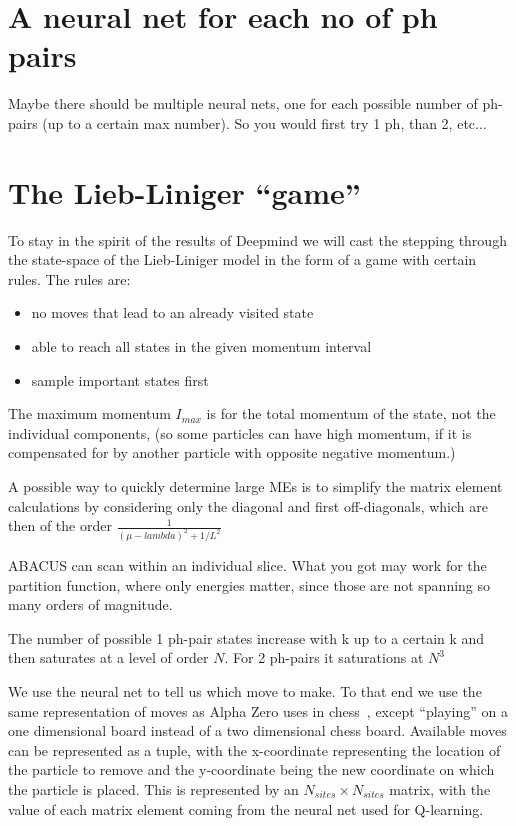 \documentclass[11pt, a4paper]{report} %
\begin{document}
\section{A neural net for each no of ph pairs}
Maybe there should be multiple neural nets, one for each possible number of ph-pairs (up to a certain max number).
So you would first try 1 ph, than 2, etc...

\section{The Lieb-Liniger ``game''}

To stay in the spirit of the results of Deepmind we will cast the stepping through the state-space of the Lieb-Liniger model in the form of a game with certain rules.
The rules are:
\begin{itemize}
  \item no moves that lead to an already visited state
  \item able to reach all states in the given momentum interval
  \item sample important states first
\end{itemize}

The maximum momentum $I_{max}$ is for the total momentum of the state, not the individual components, (so some particles can have high momentum, if it is compensated for by another particle with opposite negative momentum.)

A possible way to quickly determine large MEs is to simplify the matrix element calculations by considering only the diagonal and first off-diagonals, which are then of the order $\frac{1}{(\mu-lambda)^2 + 1/L^2}$

ABACUS can scan within an individual slice.
What you got may work for the partition function, where only energies matter, since those are not spanning so many orders of magnitude.

The number of possible 1 ph-pair states increase with k up to a certain k and then saturates at a level of order $N$.
For 2 ph-pairs it saturations at $N^3$

We use the neural net to tell us which move to make.
To that end we use the same representation of moves as Alpha Zero uses in chess~\cite{Silver2017}, except ``playing'' on a one dimensional board instead of a two dimensional chess board.
Available moves can be represented as a tuple, with the x-coordinate representing the location of the particle to remove and the y-coordinate being the new coordinate on which the particle is placed.
This is represented by an $N_{sites} \times N_{sites}$ matrix, with the value of each matrix element coming from the neural net used for Q-learning.
\end{document}
